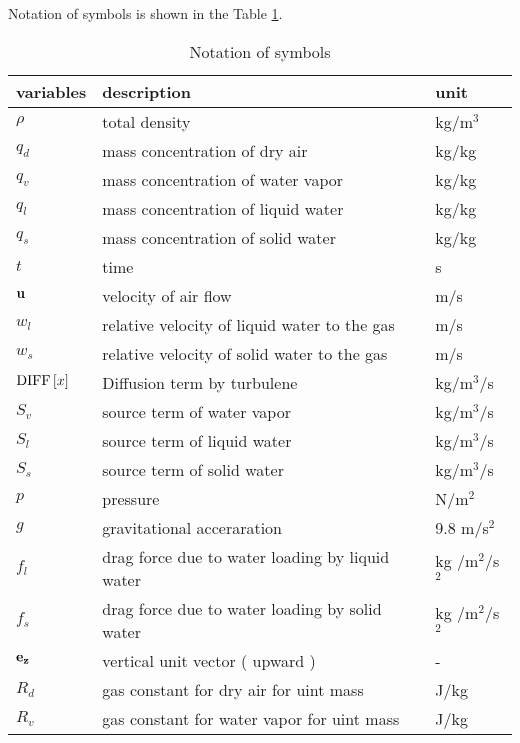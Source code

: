 Notation of symbols is shown in the Table \ref{table:notation}.

\begin{table}[htbp]
  \caption{Notation of symbols}
  \label{table:notation}
  \begin{tabular}{lll}\hline
    variables & description & unit \\ \hline
    $\rho$ & total density                       &  kg/m$^3$\\
    $q_d$  & mass concentration of dry air       &  kg/kg   \\
    $q_v$  & mass concentration of water vapor   &  kg/kg   \\
    $q_l$  & mass concentration of liquid water &   kg/kg   \\
    $q_s$  & mass concentration of solid water &    kg/kg   \\
    $t$    & time                              &   s   \\
    ${\bf u}$  & velocity of air flow          &   m/s   \\
    $w_l$  & relative velocity of liquid water to the gas    &   m/s   \\
    $w_s$  & relative velocity of solid water to the gas    &    m/s   \\
    ${\rm DIFF}\left[ x \right]$  & Diffusion term by turbulene  &    kg/m$^3$/s   \\
    $S_v$    & source term of water vapor                     &    kg/m$^3$/s   \\
    $S_l$    & source term of liquid water                     &   kg/m$^3$/s   \\
    $S_s$    & source term of solid water                     &    kg/m$^3$/s   \\
    $p$      & pressure                                       &   N/m$^2$  \\
    $g$      & gravitational acceraration                     &   9.8 m/s$^2$ \\
    $f_l$      & drag force due to water loading by liquid water  &   kg /m$^2$/s$^2$ \\
    $f_s$      & drag force due to water loading by solid water   &   kg /m$^2$/s$^2$ \\
    ${\bf e_z}$ & vertical unit vector ( upward )                 &  - \\
    $R_d$ & gas constant for dry air for uint mass               &  J/kg \\
    $R_v$ & gas constant for water vapor for uint mass               &  J/kg \\

\end{tabular}
\end{table}

